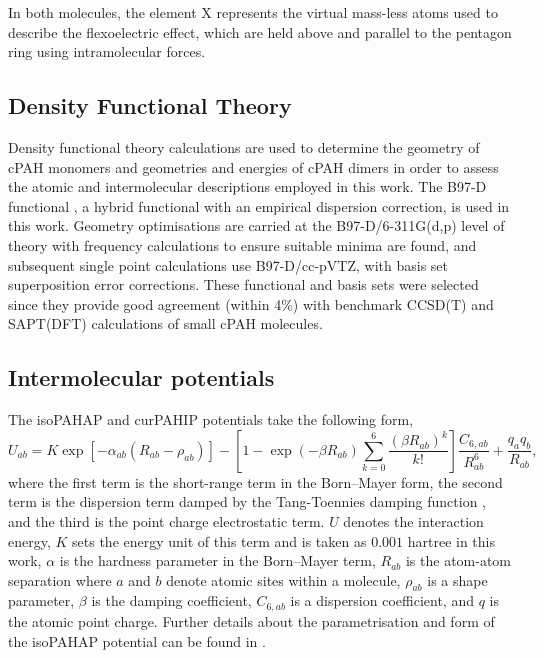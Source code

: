 In both molecules, the element X represents the virtual mass-less atoms used to describe the flexoelectric effect, which are held above and parallel to the pentagon ring using intramolecular forces.

\subsection{Density Functional Theory}
\label{secSI:DFT}
Density functional theory calculations are used to determine the geometry of cPAH monomers and geometries and energies of cPAH dimers in order to assess the atomic and intermolecular descriptions employed in this work. The B97-D functional \cite{grimme2006semiempirical}, a hybrid functional with an empirical dispersion correction, is used in this work. Geometry optimisations are carried at the B97-D/6-311G(d,p) level of theory with frequency calculations to ensure suitable minima are found, and subsequent single point calculations use B97-D/cc-pVTZ, with basis set superposition error corrections.  These functional and basis sets were selected since they provide good agreement (within 4\%) with benchmark CCSD(T) \cite{janowski2011convex} and SAPT(DFT) \cite{Cabaleiro-Lago2018} calculations of small cPAH molecules.

\subsection{Intermolecular potentials}
\label{sec:SIpotentials}
The isoPAHAP and curPAHIP potentials take the following form, 
%
\begin{equation}
\label{eqn:isoPAHAP}
U_{ab} = K \exp \left[ - \alpha_{ab} \left( R_{ab} - \rho_{ab} \right) \right] - \left[ 1 - \exp \left( - \beta R_{ab} \right) \sum_{k=0}^{6} \frac{ \left( \beta R_{ab} \right) ^{k}}{k!} \right] \frac{C_{6,ab}}{R_{ab}^{6}} + \frac{q_{a} q_{b}}{R_{ab}},
\end{equation}
%
where the first term is the short-range term in the Born--Mayer form, the second term is the dispersion term damped by the Tang-Toennies damping function \citep{Tang1984}, and the third is the point charge electrostatic term. $U$ denotes the interaction energy, $K$ sets the energy unit of this term and is taken as $0.001$ hartree in this work, $\alpha$ is the hardness parameter in the Born--Mayer term, $R_{ab}$ is the atom-atom separation where $a$ and $b$ denote atomic sites within a molecule, $\rho_{ab}$ is a shape parameter, $\beta$ is the damping coefficient, $C_{6,ab}$ is a dispersion coefficient, and $q$ is the atomic point charge. Further details about the parametrisation and form of the isoPAHAP potential can be found in \citet{totton2010first}.

